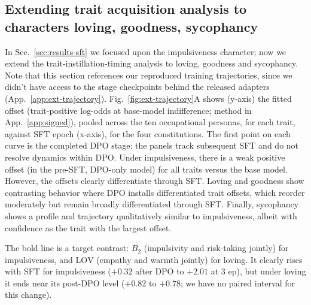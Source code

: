 \documentclass{article}
\begin{document}

\subsection{Extending trait acquisition analysis to characters loving, goodness, sycophancy}
\label{sec:ext-trajectory}
In Sec.~\ref{sec:results-sft} we focused upon the impulsiveness character; now we extend the trait-instillation-timing analysis to loving, goodness and sycophancy. Note that this section references our reproduced training trajectories, since we didn't have access to the stage checkpoints behind the released adapters (App.~\ref{app:ext-trajectory}). Fig.~\ref{fig:ext-trajectory}A shows (y-axis) the fitted offset (trait-positive log-odds at base-model indifference; method in App.~\ref{app:signed}), pooled across the ten occupational personas, for each trait, against SFT epoch (x-axis), for the four constitutions. The first point on each curve is the completed DPO stage: the panels track subsequent SFT and do not resolve dynamics within DPO. Under impulsiveness, there is a weak positive offset (in the pre-SFT, DPO-only model) for all traits versus the base model. However, the offsets clearly differentiate through SFT. Loving and goodness show contrasting behavior where DPO installs differentiated trait offsets, which reorder moderately but remain broadly differentiated through SFT. Finally, sycophancy shows a profile and trajectory qualitatively similar to impulsiveness, albeit with confidence as the trait with the largest offset.

The bold line is a target contrast: $B_2$ (impulsivity and risk-taking jointly) for impulsiveness, and $\mathrm{LOV}$ (empathy and warmth jointly) for loving. It clearly rises with SFT for impulsiveness ($+0.32$ after DPO to $+2.01$ at 3 ep), but under loving it ends near its post-DPO level ($+0.82$ to $+0.78$; we have no paired interval for this change).
\end{document}
